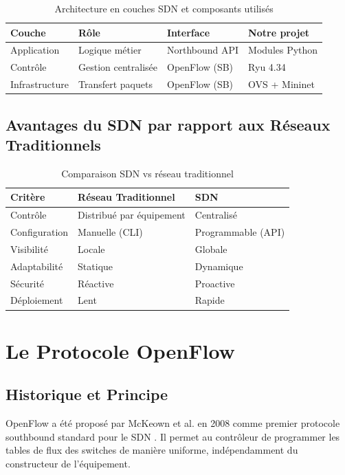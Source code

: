 \documentclass[12pt,a4paper]{report}
\begin{document}
\begin{table}[H]
\centering
\caption{Architecture en couches SDN et composants utilisés}
\label{tab:couches_sdn}
\begin{tabular}{llll}
\toprule
\textbf{Couche} & \textbf{Rôle} &
\textbf{Interface} & \textbf{Notre projet} \\
\midrule
Application & Logique métier & Northbound API &
Modules Python \\
Contrôle & Gestion centralisée & OpenFlow (SB) &
Ryu 4.34 \\
Infrastructure & Transfert paquets & OpenFlow (SB) &
OVS + Mininet \\
\bottomrule
\end{tabular}
\end{table}

\subsection{Avantages du SDN par rapport aux Réseaux Traditionnels}

\begin{table}[H]
\centering
\caption{Comparaison SDN vs réseau traditionnel}
\label{tab:sdn_vs_trad}
\begin{tabular}{lll}
\toprule
\textbf{Critère} & \textbf{Réseau Traditionnel} & \textbf{SDN} \\
\midrule
Contrôle & Distribué par équipement & Centralisé \\
Configuration & Manuelle (CLI) & Programmable (API) \\
Visibilité & Locale & Globale \\
Adaptabilité & Statique & Dynamique \\
Sécurité & Réactive & Proactive \\
Déploiement & Lent & Rapide \\
\bottomrule
\end{tabular}
\end{table}

\section{Le Protocole OpenFlow}

\subsection{Historique et Principe}
OpenFlow a été proposé par McKeown et al. en 2008 comme
premier protocole southbound standard pour le SDN
\cite{openflow_spec}. Il permet au contrôleur de programmer
les tables de flux des switches de manière uniforme,
indépendamment du constructeur de l'équipement.
\end{document}
